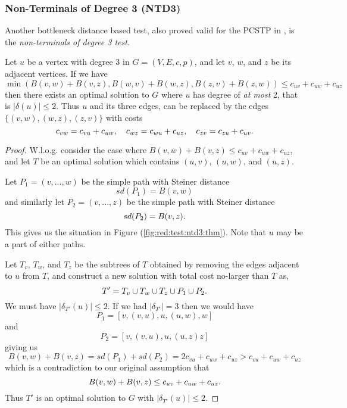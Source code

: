 \subsubsection{Non-Terminals of Degree 3 (NTD3)}
\label{sec:red:test:deg3}
Another bottleneck distance based test,
also proved valid for the PCSTP in \cite{uchoa2006reduction},
is the \textit{non-terminals of degree 3 test}.
\begin{theorem}\label{thm:ntd3}
  Let $u$ be a vertex with degree 3 in $G = (V, E, c, p)$,
  and let $v$, $w$, and $z$ be its adjacent
  vertices. If we have
  $$\min\left(B(v,w) + B(v,z), B(w,v) + B(w,z),  B(z, v)+ B(z, w)\right) \leq
  c_{uv} + c_{uw} + c_{uz}$$
  then there exists an optimal solution to $G$ where $u$ has degree of
  \textit{at most} 2, that is $|\delta(u)| \leq 2$. Thus $u$ and its three edges, can be replaced by
  the edges $\{(v, w), (w,z), (z,v)\}$ with costs
  $$c_{vw} = c_{vu} + c_{uw},\quad c_{wz} = c_{wu} + c_{uz},\quad c_{zv} = c_{zu} + c_{uv}\mathnormal{.}$$
\end{theorem}
\begin{proof}   
  W.l.o.g. consider the case where $B(v,w) + B(v,z) \leq c_{uv} + c_{uw} + c_{uz}$,
  and let $T$ be an optimal solution which contains $(u,v)$, $(u,w)$, and $(u,z)$.

  Let $P_1 = (v, ..., w)$ be the simple path with Steiner distance
  $$sd(P_1) = B(v,w)$$
  and similarly let $P_2 = (v, ..., z)$ be the simple path with Steiner distance
  $$sd(P_2) = B(v,z)\mathnormal{.}$$
  This gives us the situation in Figure (\ref{fig:red:test:ntd3:thm}). Note that $u$ may be a part of either paths.

  Let $T_v$, $T_w$, and $T_z$ be the subtrees of $T$ obtained by
  removing the edges adjacent to $u$ from $T$, and construct a new solution with
   total cost no-larger than $T$ as,
   $$T' = T_v \cup T_w \cup T_z \cup P_1 \cup P_2\mathnormal{.}$$
   We must have $|\delta_{T'}(u)| \leq 2$. If we had $|\delta_{T'}| = 3$ then
   we would have
   $$P_1 = \left[v, (v,u), u, (u,w), w \right]$$
   and
   $$P_2 = \left[v, (v,u), u, (u,z) z \right]$$
   giving us
   $$B(v,w) + B(v, z) = sd(P_1) + sd(P_2) = 2 c_{vu} + c_{uw} + c_{uz} > c_{vu} + c_{uw} + c_{uz}$$
   which is a contradiction to our original assumption that
   $$B(v,w) + B(v,z) \leq c_{uv} + c_{uw} + c_{uz}\mathnormal{.}$$
   Thus $T'$ is an optimal solution to $G$ with $|\delta_{T'}(u)| \leq 2$.
\end{proof}
